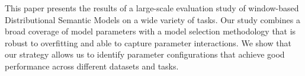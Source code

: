 This paper presents the results of a large-scale evaluation study of window-based Distributional Semantic Models on a wide variety of tasks. Our study combines a broad coverage of model parameters with a model selection methodology that is robust to overfitting and able to capture parameter interactions. We show that our strategy allows us to identify parameter configurations that achieve good performance across different datasets and tasks.